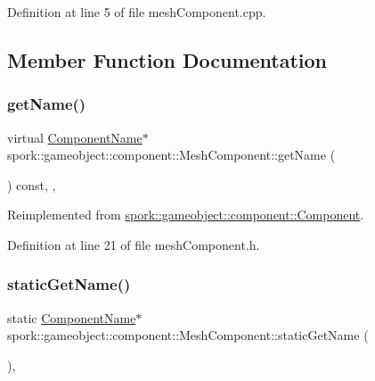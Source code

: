 Definition at line 5 of file mesh\+Component.\+cpp.



\subsection{Member Function Documentation}
\mbox{\label{classspork_1_1gameobject_1_1component_1_1_mesh_component_ac415c0ccc8938827b3f450c15a79d1b0}} 
\subsubsection{\texorpdfstring{get\+Name()}{getName()}}
{\footnotesize\ttfamily virtual \hyperlink{structspork_1_1gameobject_1_1component_1_1_component_name}{Component\+Name}$\ast$ spork\+::gameobject\+::component\+::\+Mesh\+Component\+::get\+Name (\begin{DoxyParamCaption}{ }\end{DoxyParamCaption}) const\hspace{0.3cm}{\ttfamily [inline]}, {\ttfamily [override]}, {\ttfamily [virtual]}}



Reimplemented from \hyperlink{classspork_1_1gameobject_1_1component_1_1_component_ac47356483f2a091e46ad7aaf99cb1595}{spork\+::gameobject\+::component\+::\+Component}.



Definition at line 21 of file mesh\+Component.\+h.

\mbox{\label{classspork_1_1gameobject_1_1component_1_1_mesh_component_a9505bda8af35f17c9038f54d2c3d485d}} 
\subsubsection{\texorpdfstring{static\+Get\+Name()}{staticGetName()}}
{\footnotesize\ttfamily static \hyperlink{structspork_1_1gameobject_1_1component_1_1_component_name}{Component\+Name}$\ast$ spork\+::gameobject\+::component\+::\+Mesh\+Component\+::static\+Get\+Name (\begin{DoxyParamCaption}{ }\end{DoxyParamCaption})\hspace{0.3cm}{\ttfamily [inline]}, {\ttfamily [static]}}




